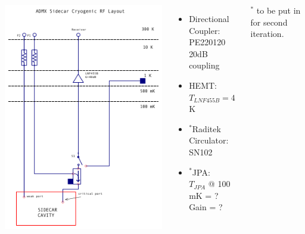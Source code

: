 \documentclass{beamer}
\begin{document}
\begin{frame}
\begin{columns}
\includegraphics[width=\textwidth]{export_cryo_layout_sidecar}
\begin{itemize}
\item{\tiny Directional Coupler: PE220120 \\ 20dB coupling}
\item {\tiny HEMT: \\ $T_{LNF455B} = 4$ K}
\item {\tiny $^*$Raditek Circulator: \\ SN102}
\item {\tiny $^*$JPA: \\ $T_{JPA}$ @ 100 mK = ? \\ Gain = ?}
\end{itemize}
{\tiny $^*$ to be put in for second iteration.}
\end{columns}
\end{frame}
\end{document}
